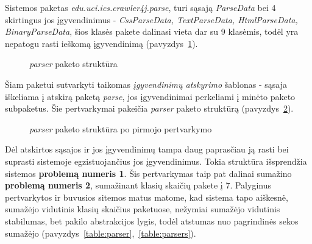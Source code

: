 Sistemos paketas \textit{edu.uci.ics.crawler4j.parse}, turi sąsają \textit{ParseData} bei 4 skirtingus jos įgyvendinimus - \textit{CssParseData, TextParseData, HtmlParseData, BinaryParseData},
šios klasės pakete dalinasi vieta dar su 9 klasėmis, todėl yra nepatogu rasti ieškomą įgyvendinimą (pavyzdys~\ref{fig:parse}).
\begin{figure}[H]
    \snugshade
    \endsnugshade
    \caption{\textit{parser} paketo struktūra}
    \label{fig:parse}
\end{figure}
Šiam paketui sutvarkyti taikomas \textit{įgyvendinimų atskyrimo} šablonas - sąsaja iškeliama į atskirą paketą \textit{parse}, jos įgyvendinimai perkeliami į minėto
paketo subpaketus.
Šie pertvarkymai pakeičia \textit{parser} paketo struktūrą (pavyzdys~\ref{fig:parser}).
\begin{figure}[H]
    \snugshade
    \endsnugshade
    \caption{\textit{parser} paketo struktūra po pirmojo pertvarkymo}
    \label{fig:parser}
\end{figure}
Dėl atskirtos sąsajos ir jos įgyvendinimų tampa daug paprasčiau ją rasti bei suprasti sistemoje egzistuojančius jos įgyvendinimus.
Tokia struktūra išsprendžia sistemos \textbf{problemą numeris 1}.
Šis pertvarkymas taip pat dalinai sumažino \textbf{problemą numeris 2}, sumažinant klasių skaičių pakete į 7.
Palyginus pertvarkytos ir buvusios sitemos matus matome, kad sistema tapo aiškesnė, sumažėjo vidutinis klasių skaičius paketuose, nežymiai sumažėjo
vidutinis stabilumas, bet pakilo abstrakcijos lygis, todėl atstumas nuo pagrindinės sekos sumažėjo (pavyzdys~\ref{table:parser},~\ref{table:parsers}).
